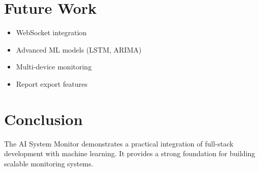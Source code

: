 \documentclass[12pt]{article}
\begin{document}
\section{Future Work}
\begin{itemize}
\item WebSocket integration
\item Advanced ML models (LSTM, ARIMA)
\item Multi-device monitoring
\item Report export features
\end{itemize}

\section{Conclusion}
The AI System Monitor demonstrates a practical integration of full-stack development with machine learning. It provides a strong foundation for building scalable monitoring systems.
\end{document}
